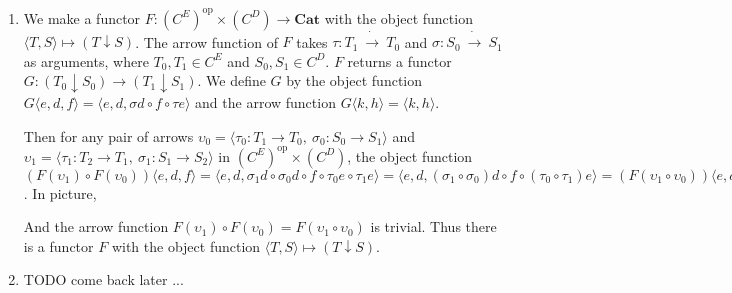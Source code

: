 \documentclass[luatex]{article}
\begin{document}
\begin{enumerate}[label=(\alph*)]
  \item We make a functor $F : (C^E)^{\mathrm{op}} \times (C^D) \rightarrow \mathbf{Cat}$ with the object function $\langle T, S \rangle \mapsto (T \downarrow S)$. The arrow function of $F$ takes $\tau : T_1\ \dot{\rightarrow}\ T_0$ and $\sigma : S_0\ \dot{\rightarrow}\ S_1$ as arguments, where $T_0, T_1 \in C^E$ and $S_0, S_1 \in C^D$. $F$ returns a functor $G : (T_0 \downarrow S_0) \rightarrow (T_1 \downarrow S_1)$. We define $G$ by the object function $G\langle e, d, f \rangle = \langle e, d, \sigma d \circ f \circ \tau e \rangle$ and the arrow function $G\langle k, h \rangle = \langle k, h \rangle$.
  
  Then for any pair of arrows $\upsilon_0 = \langle \tau_0 : T_1 \rightarrow T_0,\ \sigma_0 : S_0 \rightarrow S_1\rangle$ and $\upsilon_1 = \langle \tau_1 : T_2 \rightarrow T_1,\ \sigma_1 : S_1 \rightarrow S_2\rangle$ in $(C^E)^\mathrm{op} \times (C^D)$, the object function $(F(\upsilon_1) \circ F(\upsilon_0))\langle e, d, f \rangle = \langle e, d, \sigma_1 d \circ \sigma_0 d \circ f \circ \tau_0 e \circ \tau_1 e \rangle = \langle e, d, (\sigma_1 \circ \sigma_0) d \circ f \circ (\tau_0 \circ \tau_1) e \rangle = (F(\upsilon_1 \circ \upsilon_0))\langle e, d, f \rangle$. In picture, 

  \begin{center}
  \end{center}

  And the arrow function $F(\upsilon_1) \circ F(\upsilon_0) = F(\upsilon_1 \circ \upsilon_0)$ is trivial. Thus there is a functor $F$ with the object function $\langle T, S \rangle \mapsto (T \downarrow S)$.

  \item TODO come back later ...
\end{enumerate}

\subsection{}

\subsubsection{}
\end{document}
